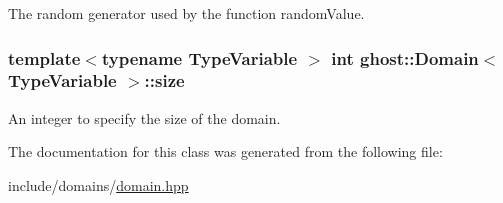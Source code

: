 The random generator used by the function random\-Value. 

\hypertarget{classghost_1_1Domain_a13e282f60c6c7cddf5b5716b45ad161c}{
\subsubsection[{size}]{\setlength{\rightskip}{0pt plus 5cm}template$<$typename Type\-Variable $>$ int {\bf ghost\-::\-Domain}$<$ Type\-Variable $>$\-::size\hspace{0.3cm}{\ttfamily [protected]}}}\label{classghost_1_1Domain_a13e282f60c6c7cddf5b5716b45ad161c}


An integer to specify the size of the domain. 



The documentation for this class was generated from the following file\-:\begin{DoxyCompactItemize}
\item 
include/domains/\hyperlink{domain_8hpp}{domain.\-hpp}\end{DoxyCompactItemize}
